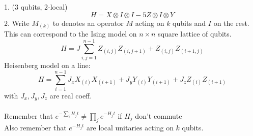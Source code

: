 \documentclass{article}
\begin{document}
                       1. (3 qubits, 2-local)
                       $$
                       H = X \otimes I \otimes I - 5 Z \otimes I \otimes Y
                       $$
                       2. Write $M_{(k)}$ to denotes an operator $M$ acting on $k$ qubits and $I$ on the rest. This can correspond to the Ising model on $n\times n$ square lattice of qubits. 
$$H = J \sum_{i,j=1}^{n-1} Z_{(i,j)} Z_{(i, j+1)} + Z_{(i,j)}Z_{(i+1,j)}$$
Heisenberg model on a line:
$$
H = \sum_{i=1}^{n-1} J_x X_{(i)} X_{(i+1)}  + J_y Y_{(i)} Y_{(i+1)} + J_z Z_{(i)} Z_{(i+1)}
$$
with $J_x, J_y, J_z$ are real coeff.\\\\
Remember that $e^{-\sum_i H_jt} \neq  \prod_j e^{- H_j t}$ if $H_j$ don't commute\\
Also remember that $e^{-H_j t}$ are local unitaries acting on $k$ qubits.
\end{document}
